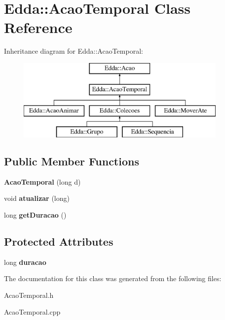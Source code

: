 \hypertarget{class_edda_1_1_acao_temporal}{
\section{Edda::AcaoTemporal Class Reference}
\label{class_edda_1_1_acao_temporal}
}
Inheritance diagram for Edda::AcaoTemporal:\begin{figure}[H]
\begin{center}
\leavevmode
\includegraphics[height=4.000000cm]{class_edda_1_1_acao_temporal}
\end{center}
\end{figure}
\subsection*{Public Member Functions}
\begin{DoxyCompactItemize}
\item 
\hypertarget{class_edda_1_1_acao_temporal_a585f57574847220cb3ce909811084dbb}{
{\bfseries AcaoTemporal} (long d)}
\label{class_edda_1_1_acao_temporal_a585f57574847220cb3ce909811084dbb}

\item 
\hypertarget{class_edda_1_1_acao_temporal_a2ecc59bbbda5a2014c62320265a5a66a}{
void {\bfseries atualizar} (long)}
\label{class_edda_1_1_acao_temporal_a2ecc59bbbda5a2014c62320265a5a66a}

\item 
\hypertarget{class_edda_1_1_acao_temporal_a3406ed807ec09444176c9b7787cf3d81}{
long {\bfseries getDuracao} ()}
\label{class_edda_1_1_acao_temporal_a3406ed807ec09444176c9b7787cf3d81}

\end{DoxyCompactItemize}
\subsection*{Protected Attributes}
\begin{DoxyCompactItemize}
\item 
\hypertarget{class_edda_1_1_acao_temporal_a45d2f8a606fa0df86183476df84cc5f3}{
long {\bfseries duracao}}
\label{class_edda_1_1_acao_temporal_a45d2f8a606fa0df86183476df84cc5f3}

\end{DoxyCompactItemize}


The documentation for this class was generated from the following files:\begin{DoxyCompactItemize}
\item 
AcaoTemporal.h\item 
AcaoTemporal.cpp\end{DoxyCompactItemize}
